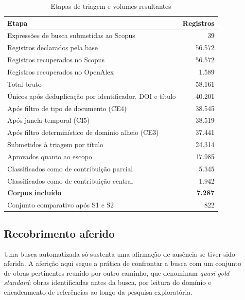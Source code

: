 \begin{table}[htb]
\centering
\caption{Etapas de triagem e volumes resultantes}
\label{tab:triagem}
\scriptsize
\begin{tabularx}{\textwidth}{@{}X r@{}}
\toprule
\textbf{Etapa} & \textbf{Registros} \\
\midrule
Expressões de busca submetidas ao Scopus & 39 \\
Registros declarados pela base & 56.572 \\
Registros recuperados no Scopus & 56.572 \\
Registros recuperados no OpenAlex & 1.589 \\
\midrule
Total bruto & 58.161 \\
Únicos após deduplicação por identificador, DOI e título & 40.201 \\
Após filtro de tipo de documento (CE4) & 38.545 \\
Após janela temporal (CI5) & 38.519 \\
Após filtro determinístico de domínio alheio (CE3) & 37.441 \\
\midrule
Submetidos à triagem por título & 24.314 \\
Aprovados quanto ao escopo & 17.985 \\
Classificados como de contribuição parcial & 5.345 \\
Classificados como de contribuição central & 1.942 \\
\midrule
\textbf{Corpus incluído} & \textbf{7.287} \\
Conjunto comparativo após S1 e S2 & 822 \\
\bottomrule
\end{tabularx}
\end{table}

\subsection{Recobrimento aferido}
\label{sec:recobrimento}

Uma busca automatizada só sustenta uma afirmação de ausência se tiver sido aferida. A aferição aqui segue a prática de confrontar a busca com um conjunto de obras pertinentes reunido por outro caminho, que  denominam \textit{quasi-gold standard}: obras identificadas antes da busca, por leitura do domínio e encadeamento de referências ao longo da pesquisa exploratória.

